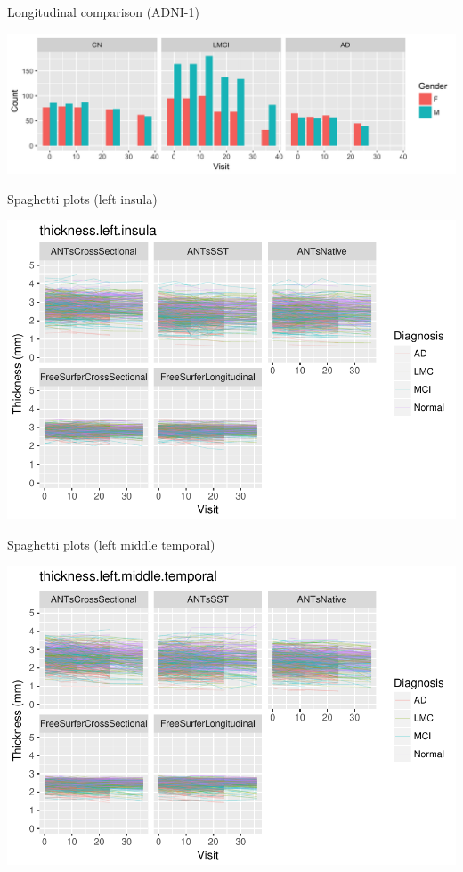 \documentclass[ignorenonframetext,]{beamer}
\begin{document}
\begin{frame}{Longitudinal comparison (ADNI-1)}

\centering
\includegraphics[width=0.99 \textwidth]{../Figures/demoPlot.png}

\end{frame}

\begin{frame}{Spaghetti plots (left insula)}

\centering
\includegraphics[width=0.9 \textwidth]{../data/RegionalThicknessSpaghettiPlots/thicknessleftinsula.pdf}

\end{frame}

\begin{frame}{Spaghetti plots (left middle temporal)}

\centering
\includegraphics[width=0.99 \textwidth]{../data/RegionalThicknessSpaghettiPlots/thicknessleftmiddletemporal.pdf}

\end{frame}
\end{document}
